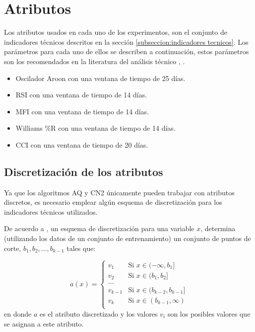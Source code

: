 \documentclass[12pt]{report}
\theoremstyle{break}
\theoremstyle{break}
\begin{document}
\section{Atributos}
\label{seccion:atributos}
Los atributos usados en cada uno de los experimentos, son el conjunto de indicadores técnicos descritos en la sección \ref{subseccion:indicadores tecnicos}. Los parámetros para cada uno de ellos se describen a continuación, estos parámetros son los recomendados en la literatura del análisis técnico \cite{encycoplediaTechnicalIndicators}, \cite{technicalAnalysisKirkPatrick}.

\begin{itemize}
\item Oscilador Aroon con una ventana de tiempo de 25 días.

\item RSI con una ventana de tiempo de 14 días.

\item MFI con una ventana de tiempo de 14 días.

\item Williams \%R con una ventana de tiempo de 14 días.

\item CCI con una ventana de tiempo de 20 días.
\end{itemize}

\subsection{Discretización de los atributos}
\label{subseccion:discretizacion de atributos}
Ya que los algoritmos AQ y CN2 únicamente pueden trabajar con atributos discretos, es necesario emplear algún esquema de discretización para los indicadores técnicos utilizados.

De acuerdo a \cite{dataMiningUsingR}, un esquema de discretización para una variable $x$, determina (utilizando los datos de un conjunto de entrenamiento) un conjunto de puntos de corte, $b_1, b_2, \ldots, b_{k- 1}$ tales que:

$$
a(x) = 
\begin{cases}
v_1 & \mbox{Si } x \in (-\infty, b_1] \\
v_2 & \mbox{Si } x \in (b_1, b_2] \\
\ldots \\
v_{k - 1} & \mbox{Si } x \in (b_{k - 2}, b_{k -1}]\\
v_k & \mbox{Si } x \in (b_{k - 1}, \infty)\\
\end{cases}
$$
en donde $a$ es el atributo discretizado y los valores $v_i$ son los posibles valores que se asignan a este atributo.
\end{document}
